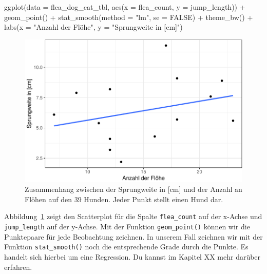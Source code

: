\documentclass[
  letterpaper,
]{scrbook}
\newenvironment{Shaded}{\begin{snugshade}}{\end{snugshade}}
\newcommand{\AttributeTok}[1]{\textcolor[rgb]{0.40,0.45,0.13}{#1}}
\newcommand{\ConstantTok}[1]{\textcolor[rgb]{0.56,0.35,0.01}{#1}}
\newcommand{\FunctionTok}[1]{\textcolor[rgb]{0.28,0.35,0.67}{#1}}
\newcommand{\NormalTok}[1]{\textcolor[rgb]{0.00,0.23,0.31}{#1}}
\newcommand{\SpecialCharTok}[1]{\textcolor[rgb]{0.37,0.37,0.37}{#1}}
\newcommand{\StringTok}[1]{\textcolor[rgb]{0.13,0.47,0.30}{#1}}
\begin{document}
\begin{Shaded}
\begin{Highlighting}[]
\FunctionTok{ggplot}\NormalTok{(}\AttributeTok{data =}\NormalTok{ flea\_dog\_cat\_tbl, }\FunctionTok{aes}\NormalTok{(}\AttributeTok{x =}\NormalTok{ flea\_count, }\AttributeTok{y =}\NormalTok{ jump\_length)) }\SpecialCharTok{+}
  \FunctionTok{geom\_point}\NormalTok{() }\SpecialCharTok{+}
  \FunctionTok{stat\_smooth}\NormalTok{(}\AttributeTok{method =} \StringTok{"lm"}\NormalTok{, }\AttributeTok{se =} \ConstantTok{FALSE}\NormalTok{) }\SpecialCharTok{+}
  \FunctionTok{theme\_bw}\NormalTok{() }\SpecialCharTok{+}
  \FunctionTok{labs}\NormalTok{(}\AttributeTok{x =} \StringTok{"Anzahl der Flöhe"}\NormalTok{, }\AttributeTok{y =} \StringTok{"Sprungweite in [cm]"}\NormalTok{) }
\end{Highlighting}
\end{Shaded}

\begin{figure}[H]

{\centering \includegraphics{./eda-ggplot_files/figure-pdf/fig-scatter-flea-0-1.pdf}

}

\caption{\label{fig-scatter-flea-0}Zusammenhang zwischen der Sprungweite
in {[}cm{]} und der Anzahl an Flöhen auf den 39 Hunden. Jeder Punkt
stellt einen Hund dar.}

\end{figure}

Abbildung~\ref{fig-scatter-flea-0} zeigt den Scatterplot für die Spalte
\texttt{flea\_count} auf der x-Achse und \texttt{jump\_length} auf der
y-Achse. Mit der Funktion \texttt{geom\_point()} können wir die
Punktepaare für jede Beobachtung zeichnen. In unserem Fall zeichnen wir
mit der Funktion \texttt{stat\_smooth()} noch die entsprechende Grade
durch die Punkte. Es handelt sich hierbei um eine Regression. Du kannst
im Kapitel XX mehr darüber erfahren.
\end{document}
